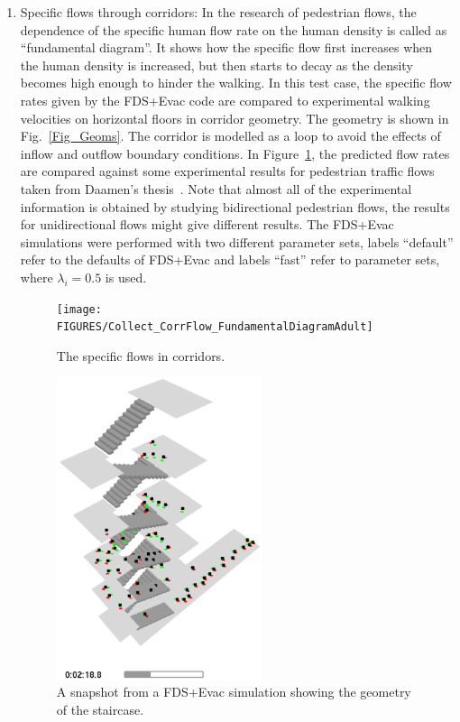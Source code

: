 \documentclass[12pt,a4paper,final,twoside]{stylevk}
\begin{document}
%
\begin{enumerate}
%
\item Specific flows through corridors: In the research of pedestrian
  flows, the dependence of the specific human flow rate on the human
  density is called as ``fundamental diagram''.  It shows how the
  specific flow first increases when the human density is increased,
  but then starts to decay as the density becomes high enough to
  hinder the walking.  In this test case, the specific flow rates
  given by the FDS+Evac code are compared to experimental walking
  velocities on horizontal floors in corridor geometry.  The geometry
  is shown in Fig.~\ref{Fig_Geoms}.  The corridor is modelled as a
  loop to avoid the effects of inflow and outflow boundary conditions.
  In Figure~\ref{Fig_CorrResults}, the predicted flow rates are
  compared against some experimental results for pedestrian traffic
  flows taken from Daamen's thesis~\cite{Daamen04}.  Note that almost
  all of the experimental information is obtained by studying
  bidirectional pedestrian flows, the results for unidirectional flows
  might give different results.  The FDS+Evac simulations were
  performed with two different parameter sets, labels ``default''
  refer to the defaults of FDS+Evac and labels ``fast'' refer to
  parameter sets, where $\lambda_i = 0.5$ is used.

%
\begin{figure}[!tb]
  \centerline{\texttt{[image: FIGURES/Collect\_CorrFlow\_FundamentalDiagramAdult]}} 
  \caption{The specific flows in corridors.}\label{Fig_CorrResults} 
\end{figure}
%

%
\begin{figure}[!b]
  \centerline{\includegraphics[clip=true,width=60mm]{FIGURES/PorrasKuva}}
  \caption{A snapshot from a FDS+Evac simulation showing the geometry
  of the staircase.}\label{Fig_StairGeom} 
\end{figure}
%


\end{enumerate}
\end{document}

